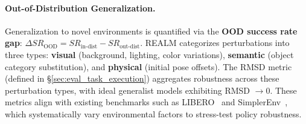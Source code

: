 \documentclass[acmsmall,screen,review,anonymous]{acmart}
\begin{document}
\paragraph{Out-of-Distribution Generalization.}
Generalization to novel environments is quantified via the \textbf{OOD success rate gap}: $\Delta SR_{\text{OOD}} = SR_{\text{in-dist}} - SR_{\text{out-dist}}$. REALM categorizes perturbations into three types: \textbf{visual} (background, lighting, color variations), \textbf{semantic} (object category substitution), and \textbf{physical} (initial pose offsets). The RMSD metric (defined in \S\ref{sec:eval_task_execution}) aggregates robustness across these perturbation types, with ideal generalist models exhibiting RMSD $\to 0$. These metrics align with existing benchmarks such as LIBERO~\cite{liu2023libero} and SimplerEnv~\cite{li2025simpler}, which systematically vary environmental factors to stress-test policy robustness.
\end{document}
